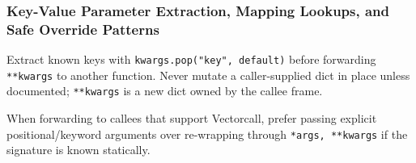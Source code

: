 \subsubsection{Key-Value Parameter Extraction, Mapping Lookups, and Safe Override Patterns}

Extract known keys with \texttt{kwargs.pop("key", default)} before forwarding \texttt{**kwargs} to another function. Never mutate a caller-supplied dict in place unless documented; \texttt{**kwargs} is a new dict owned by the callee frame.

When forwarding to callees that support Vectorcall, prefer passing explicit positional/keyword arguments over re-wrapping through \texttt{*args, **kwargs} if the signature is known statically.
